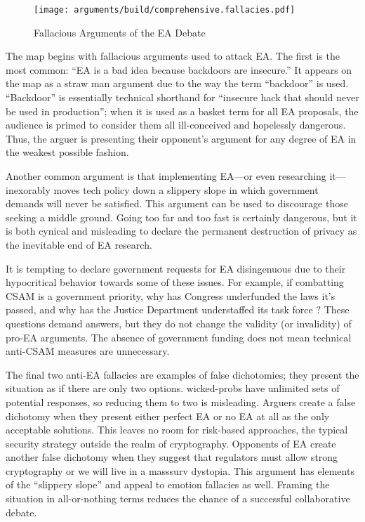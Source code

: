 \documentclass[conference]{IEEEtran}
\begin{document}
\begin{figure*}[t!]
  \centering
  \texttt{[image: arguments/build/comprehensive.fallacies.pdf]}
  \caption{Fallacious Arguments of the EA Debate}
  \label{fig-arg-fallacies}
\end{figure*}

The map begins with fallacious arguments used to attack \ac{EA}. The first is the most common: ``\ac{EA} is a bad idea
because backdoors are insecure.'' It appears on the map as a straw man argument due to the way the term ``backdoor'' is
used. ``Backdoor'' is essentially technical shorthand for ``insecure hack that should never be used in production'';
when it is used as a basket term for all \ac{EA} proposals, the audience is primed to consider them all ill-conceived
and hopelessly dangerous. Thus, the arguer is presenting their opponent's argument for any degree of \ac{EA} in the
weakest possible fashion.

Another common argument is that implementing \ac{EA}---or even researching it---inexorably moves tech policy down a
slippery slope in which government demands will never be satisfied. This argument can be used to discourage those
seeking a middle ground. Going too far and too fast is certainly dangerous, but it is both cynical and misleading to
declare the permanent destruction of privacy as the inevitable end of \ac{EA} research.

It is tempting to declare government requests for \ac{EA} disingenuous due to their hypocritical behavior towards some
of these issues. For example, if combatting \ac{CSAM} is a government priority, why has Congress underfunded the laws
it's passed, and why has the Justice Department understaffed its task force \cite{keller_internet_2019}? These questions
demand answers, but they do not change the validity (or invalidity) of pro-\ac{EA} arguments. The absence of government
funding does not mean technical anti-\ac{CSAM} measures are unnecessary.

The final two anti-\ac{EA} fallacies are examples of false dichotomies; they present the situation as if there are only
two options. \Acp{wicked-prob} have unlimited sets of potential responses, so reducing them to two is misleading.
Arguers create a false dichotomy when they present either perfect \ac{EA} or no \ac{EA} at all as the only acceptable
solutions. This leaves no room for risk-based approaches, the typical security strategy outside the realm of
cryptography. Opponents of \ac{EA} create another false dichotomy when they suggest that regulators must allow strong
cryptography or we will live in a \ac{masssurv} dystopia. This argument has elements of the ``slippery slope'' and
appeal to emotion fallacies as well. Framing the situation in all-or-nothing terms reduces the chance of a successful
collaborative debate.
\end{document}
